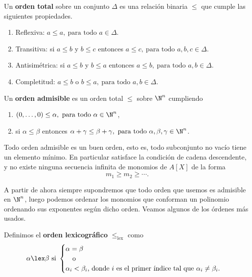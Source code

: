 \begin{definicion}
    Un \textbf{orden total} sobre un conjunto $\Delta$ es una relación binaria $\le$ que cumple las siguientes propiedades.
    \begin{enumerate}
        \item Reflexiva: $a\le a,\ \text{para todo } a\in \Delta$.
        \item Transitiva: si $a\le b$ y $b\le c$ entonces $a\le c,\ \text{para todo } a,b,c\in \Delta$.
        \item Antisimétrica: si $a\le b$ y $b\le a$ entonces $a\le b,\ \text{para todo } a,b\in \Delta$.
        \item Completitud: $a\le b$ o $b\le a,\ \text{para todo } a,b\in \Delta$.
    \end{enumerate}
\end{definicion}
\begin{definicion}
    Un \textbf{orden admisible} es un orden total $\le$ sobre $\N^n$ cumpliendo
    \begin{enumerate}
        \item $(0,\dots ,0) \le \alpha,\ \text{para todo } \alpha \in \N^n$,
        \item si $\alpha \le \beta$ entonces $\alpha + \gamma \le \beta + \gamma,\ \text{para todo } \alpha,\beta,\gamma \in \N^n$.
    \end{enumerate}
\end{definicion}
\begin{proposicion}\label{l:descendente}
    Todo orden admisible es un buen orden, esto es, todo subconjunto no vacío tiene un elemento mínimo. En particular satisface la condición de cadena descendente, y no existe ninguna secuencia infinita de monomios de $A[X]$ de la forma
    \begin{equation*}
        m_1 \ge m_2 \ge \cdots.
    \end{equation*}
\end{proposicion}

A partir de ahora siempre supondremos que todo orden que usemos es admisible en $\N^n$, luego podemos ordenar los monomios que conforman un polinomio ordenando sus exponentes según dicho orden. Veamos algunos de los órdenes más usados. 

\begin{definicion}\label{def:lex}
    Definimos el \textbf{orden lexicográfico} $\le_{\text{lex}}$ como
    \begin{equation*}
        \alpha \lex \beta \text{ si } \begin{cases}
            \alpha  = \beta \\
            \quad\text{o}   \\
            \alpha_i < \beta_i \text{, donde $i$ es el primer índice tal que } \alpha_i \neq \beta_i.
        \end{cases}
    \end{equation*}
\end{definicion}

